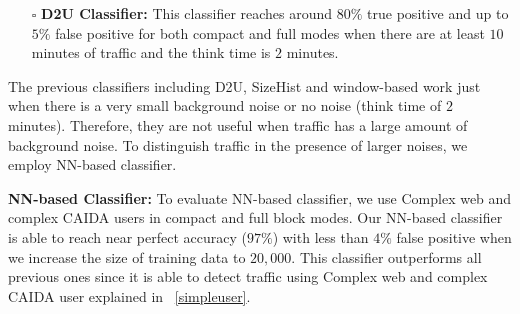 \begin{compactitem}
\begin{itemize}
\item[$\square$] \textbf{D2U Classifier:}
This classifier reaches around $80\%$ true positive and up to $5\%$ false positive for both compact and full modes when there are at least $10$ minutes of traffic and the think time is $2$ minutes. 
\end{itemize}

The previous classifiers including D2U, SizeHist and window-based work just when there is a very small background noise or no noise (think time of $2$ minutes). Therefore, they are not useful when \bc traffic has a large amount of background noise. To distinguish \bc traffic in the presence of larger noises, we employ NN-based classifier.
\item \textbf{NN-based Classifier:}
To evaluate NN-based classifier, we use Complex web and complex CAIDA users in compact and full block modes. Our NN-based classifier is able to reach near perfect accuracy ($97\%$) with less than $4\%$ false positive when we increase the size of training data to $20,000$. This classifier outperforms all previous ones since it is able to detect \bc traffic using Complex web and complex CAIDA user explained in ~\ref{simpleuser}.
\end{compactitem}
